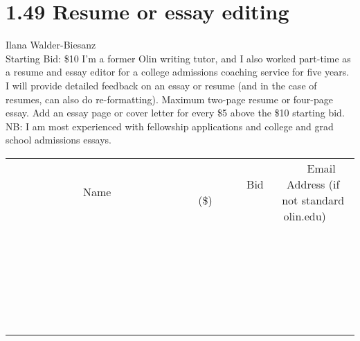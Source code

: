 \documentclass[11pt]{article}
\begin{document}
\section*{1.49 Resume or essay editing}
Ilana Walder-Biesanz
\\
Starting Bid: \$10
\newline
I'm a former Olin writing tutor, and I also worked part-time as a resume and essay editor for a college admissions coaching service for five years. I will provide detailed feedback on an essay or resume (and in the case of resumes, can also do re-formatting). Maximum two-page resume or four-page essay. Add an essay page or cover letter for every \$5 above the \$10 starting bid. NB: I am most experienced with fellowship applications and college and grad school admissions essays.
\\[6ex]
\begin{tabular}{c c c}
~~~~~~~~~~~~~Name~~~~~~~~~~~~~ & ~~~~~~~~~Bid (\$)~~~~~~~~~  & ~~~Email Address (if not standard olin.edu)~~~\\
 & & \\
\hline
 & & \\
\hline
 & & \\
\hline
 & & \\
\hline
 & & \\
\hline
 & & \\
\hline
 & & \\
\hline
 & & \\
\hline
 & & \\
\hline
 & & \\
\hline
 & & \\
\hline
 & & \\
\hline
 & & \\
\hline
 & & \\
\hline
 & & \\
\hline
 & & \\
\hline
 & & \\
\hline
 & & \\
\hline
 & & \\
\hline
 & & \\
\hline
 & & \\
\hline
 & & \\
\hline
 & & \\
\hline
 & & \\
\hline
 & & \\
\hline
 & & \\
\hline
\end{tabular}
\newpage
\end{document}
